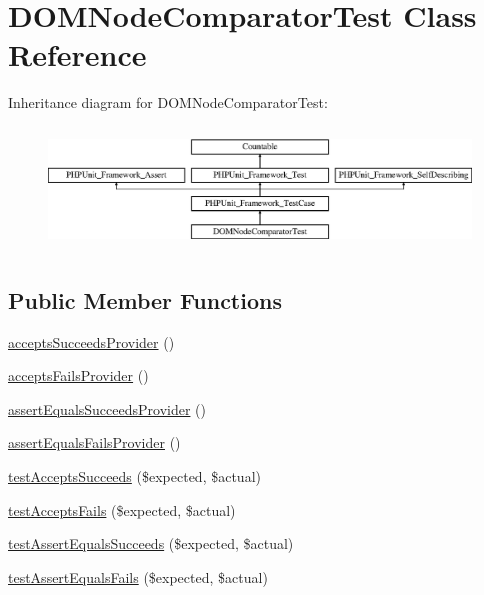 \hypertarget{class_sebastian_bergmann_1_1_comparator_1_1_d_o_m_node_comparator_test}{}\section{D\+O\+M\+Node\+Comparator\+Test Class Reference}
\label{class_sebastian_bergmann_1_1_comparator_1_1_d_o_m_node_comparator_test}
Inheritance diagram for D\+O\+M\+Node\+Comparator\+Test\+:\begin{figure}[H]
\begin{center}
\leavevmode
\includegraphics[height=3.303835cm]{class_sebastian_bergmann_1_1_comparator_1_1_d_o_m_node_comparator_test}
\end{center}
\end{figure}
\subsection*{Public Member Functions}
\begin{DoxyCompactItemize}
\item 
\mbox{\hyperlink{class_sebastian_bergmann_1_1_comparator_1_1_d_o_m_node_comparator_test_a2ca71e8095ac10e058cd9d7a68da8608}{accepts\+Succeeds\+Provider}} ()
\item 
\mbox{\hyperlink{class_sebastian_bergmann_1_1_comparator_1_1_d_o_m_node_comparator_test_a9ea19e26cacbca06356c2f229079f8a1}{accepts\+Fails\+Provider}} ()
\item 
\mbox{\hyperlink{class_sebastian_bergmann_1_1_comparator_1_1_d_o_m_node_comparator_test_acb6bc1b6e9d32990bdd287f8b590a5fa}{assert\+Equals\+Succeeds\+Provider}} ()
\item 
\mbox{\hyperlink{class_sebastian_bergmann_1_1_comparator_1_1_d_o_m_node_comparator_test_a3cc10e39239b6e3f3fda1d34c0fb1c14}{assert\+Equals\+Fails\+Provider}} ()
\item 
\mbox{\hyperlink{class_sebastian_bergmann_1_1_comparator_1_1_d_o_m_node_comparator_test_a907ea73398b22f4a8cf37728cfc981e3}{test\+Accepts\+Succeeds}} (\$expected, \$actual)
\item 
\mbox{\hyperlink{class_sebastian_bergmann_1_1_comparator_1_1_d_o_m_node_comparator_test_afe5eff1a1b7049f973a035117a7e0df1}{test\+Accepts\+Fails}} (\$expected, \$actual)
\item 
\mbox{\hyperlink{class_sebastian_bergmann_1_1_comparator_1_1_d_o_m_node_comparator_test_afb51e0f06ccb75cc8ad5b284a2e0c4cc}{test\+Assert\+Equals\+Succeeds}} (\$expected, \$actual)
\item 
\mbox{\hyperlink{class_sebastian_bergmann_1_1_comparator_1_1_d_o_m_node_comparator_test_a8cd8f77da360a8a9822bf4b9c213de5e}{test\+Assert\+Equals\+Fails}} (\$expected, \$actual)
\end{DoxyCompactItemize}
